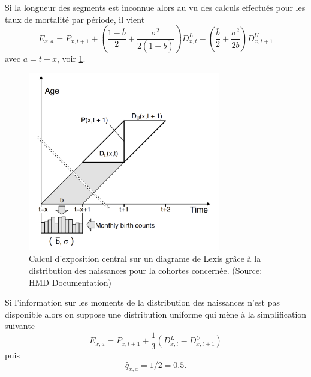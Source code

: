 Si la longueur des segments est inconnue alors au vu des calculs effectués pour les taux de mortalité par période, il vient
$$
E_{x,a}= P_{x,t+1} + \left(\frac{1-\bar{b}}{2}+\frac{\sigma^2}{2(1-\bar{b})}\right)D^L_{x,t} -  \left(\frac{\bar{b}}{2}+\frac{\sigma^2}{2\bar{b}}\right)D^U_{x,t+1}
$$
avec $a =t-x$, voir \cref{fig:death_rate_cohort_HMD}.
\begin{figure}[h!] 
\centering
\includegraphics[width = 0.75\textwidth]{../figures/death_rate_cohort_HMD.png}
\caption{Calcul d'exposition central sur un diagrame de Lexis grâce à la distribution des naissances pour la cohortes concernée. (Source: HMD Documentation)}
\label{fig:death_rate_cohort_HMD}
\end{figure}
Si l'information sur les moments de la distribution des naissances n'est pas disponible alors on suppose une distribution uniforme qui mène à la simplification suivante 
$$
E_{x,a}= P_{x,t+1} + \frac{1}{3}(D^L_{x,t} - D^U_{x,t+1})
$$
puis
$$
\widehat{q}_{x,a} = 1/2 = 0.5.
$$ 
